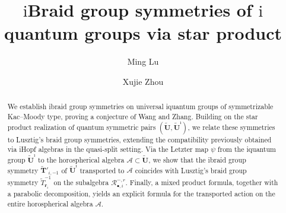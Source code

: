 \documentclass[a4paper,reqno,12pt]{amsart}
\numberwithin{equation}{section}
\theoremstyle{definition}
\theoremstyle{plain}
\theoremstyle{definition}
\def\br{\mathbf r}
\def\tU{\widetilde{\mathbf U}}
\def\tUi{\widetilde{\mathbf U}^{\imath}}
\def\tTD{\widetilde T}
\def\tTT{\widetilde{\mathbf T}}
\def\cA{\mathcal A}
\def\cR{\mathcal R}
\newcommand{\tTa}[1]{\tTT'_{#1,-1}}
\begin{document}
	
\title[$\mathrm i$Braid group symmetries of $\mathrm i$quantum groups]{$\mathrm i$Braid group symmetries of $\mathrm i$quantum groups via star product}


	
	\author[Ming Lu]{Ming Lu}
	\address{Department of Mathematics, Sichuan University, Chengdu 610064, P.R. China}
	

\author[Xujie Zhou]{Xujie Zhou}
	\address{Department of Mathematics, Sichuan University, Chengdu 610064, P.R. China}

    	
	

	
\begin{abstract}
We establish ibraid group symmetries on universal iquantum groups of symmetrizable Kac–Moody type, proving a conjecture of Wang and Zhang. Building on the star product realization of quantum symmetric pairs $(\tU,\tUi)$, we relate these symmetries to Lusztig's braid group symmetries, extending the compatibility previously obtained via iHopf algebras in the quasi-split setting. Via the Letzter map $\psi$ from the iquantum group $\tUi$ to the horospherical algebra $\cA\subset \tU$, we show that the ibraid group symmetry $\tTa{i}$ of $\tUi$ transported to  \(\mathcal A\) coincides with Lusztig's braid group symmetry \(\widetilde T_{\mathbf r_i}^{-1}\) on the subalgebra \(\mathcal R_{\bullet,i}^{-,r}\). Finally, a mixed product formula, together with a parabolic decomposition, yields an explicit formula for the transported action on the entire horospherical algebra $\mathcal A$.
\end{abstract}



\end{document}
